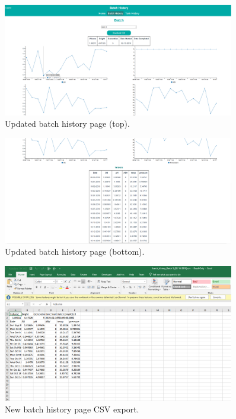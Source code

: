\documentclass[draftclsnofoot,onecolumn,journal,letterpaper,compsoc,10pt]{IEEEtran}
\begin{document}
\begin{figure}[H]
    \centering
    \includegraphics[width=0.9\textwidth]{screenshots/progress_report_screencap-batch_history_1.png}
    \caption{Updated batch history page (top).}
\end{figure}

\begin{figure}[H]
    \centering
    \includegraphics[width=0.9\textwidth]{screenshots/progress_report_screencap-batch_history_2.png}
    \caption{Updated batch history page (bottom).}
\end{figure}

\begin{figure}[H]
    \centering
    \includegraphics[width=0.9\textwidth]{screenshots/progress_report_screencap-batch_history_csv.png}
    \caption{New batch history page CSV export.}
\end{figure}
\end{document}
